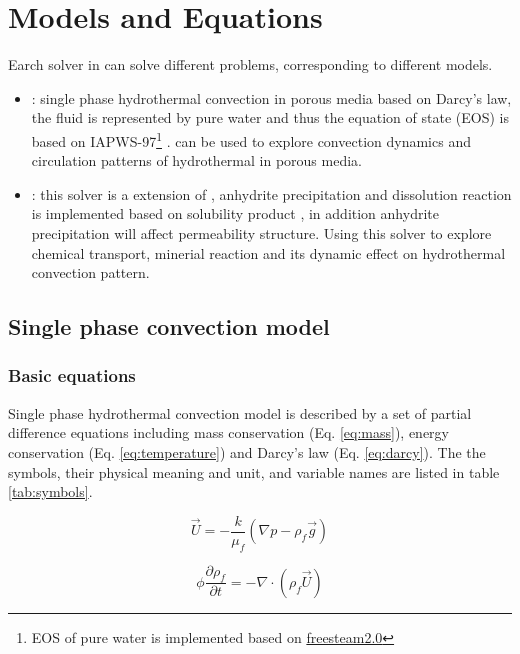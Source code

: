 \section{Models and Equations}
Earch solver in \foam can solve different problems, corresponding to different models.

\begin{itemize}
	\item \darcyfoam : single phase hydrothermal convection in porous media based on Darcy's law, the fluid is represented by pure water and thus the equation of state (EOS) is based on IAPWS-97\footnote{EOS of pure water is implemented based on \href{http://freesteam.sourceforge.net}{freesteam2.0}} \citep{wagner2007international}. 
	\darcyfoam can be used to explore convection dynamics and circulation patterns of hydrothermal in porous media.
	
	\item \anhydritefoam : this solver is a extension of \darcyfoam, anhydrite precipitation and dissolution reaction is implemented based on solubility product \citep[~e.g.][]{kawada2010formation},
	in addition anhydrite precipitation will affect permeability structure. 
	Using this solver to explore chemical transport, minerial reaction and its dynamic effect on hydrothermal convection pattern.
\end{itemize}

\subsection{Single phase convection model}

\subsubsection{Basic equations}

Single phase hydrothermal convection model is described by a set of partial difference equations including mass conservation (Eq. \ref{eq:mass}), energy conservation (Eq. \ref{eq:temperature}) and Darcy's law (Eq. \ref{eq:darcy}).
The the symbols, their physical meaning and unit, and variable names are listed in table \ref{tab:symbols}.

\begin{equation}
\vec{U} = -\frac{k}{\mu_f} \left(  \nabla p -\rho_f \vec{g}  \right)
\label{eq:darcy}
\end{equation}

\begin{equation}
	\phi \frac{\partial \rho_f}{\partial t} = -\nabla \cdot (\rho_f \vec{U})
	\label{eq:mass}
\end{equation}


